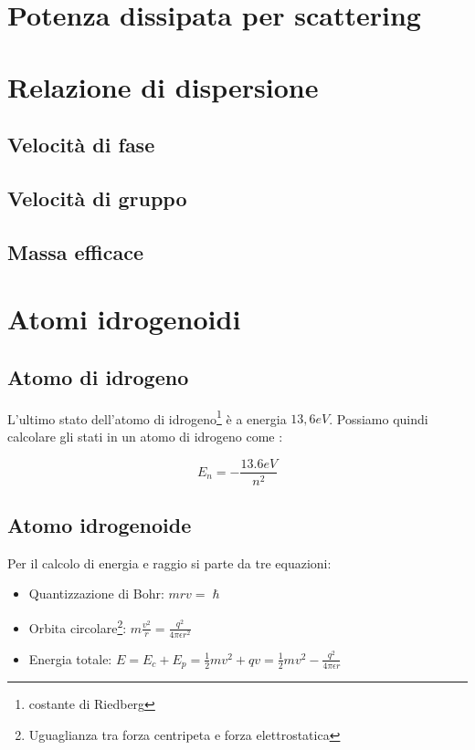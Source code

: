 \documentclass[10pt,a4paper]{report}
\begin{document}
\chapter{Potenza dissipata per scattering}

\chapter{Relazione di dispersione}

	\section{Velocità di fase}

	\section{Velocità di gruppo}

	\section{Massa efficace}


\chapter{Atomi idrogenoidi}
	
	\section{Atomo di idrogeno}

	L'ultimo stato dell'atomo di idrogeno\footnote{costante di Riedberg} è a energia $13,6eV$.
	Possiamo quindi calcolare gli stati in un atomo di idrogeno come :

	\[
	E_n=-\frac{13.6eV}{n^2}
	\] 

	\section{Atomo idrogenoide}
	Per il calcolo di energia e raggio si parte da tre equazioni:

	\begin{itemize}
	\item Quantizzazione di Bohr:   $mrv=\hslash$
	\item Orbita circolare\footnote{Uguaglianza tra forza centripeta e forza elettrostatica}:	$ m \frac {v^2} {r} = \frac{q^2}{4\pi \epsilon r^2}$
	\item Energia totale:	$E=E_c+E_p=\frac{1}{2}mv^2+qv=\frac{1}{2}mv^2-\frac{q^2}{4\pi \epsilon r}$
	\end{itemize}
		
\end{document}
